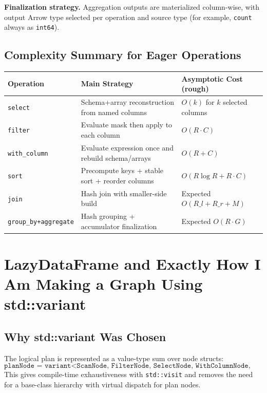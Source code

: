 \documentclass[11pt,a4paper]{article}
\begin{document}
\textbf{Finalization strategy.} Aggregation outputs are materialized column-wise, with output Arrow type selected per operation and source type (for example, \texttt{count} always as \texttt{int64}).

\subsection{Complexity Summary for Eager Operations}
\begin{longtable}{|p{3.1cm}|p{5.4cm}|p{5.0cm}|}
\hline
\textbf{Operation} & \textbf{Main Strategy} & \textbf{Asymptotic Cost (rough)} \\
\hline
\texttt{select} & Schema+array reconstruction from named columns & \(O(k)\) for \(k\) selected columns \\
\hline
\texttt{filter} & Evaluate mask then apply to each column & \(O(R \cdot C)\) \\
\hline
\texttt{with\_column} & Evaluate expression once and rebuild schema/arrays & \(O(R + C)\) \\
\hline
\texttt{sort} & Precompute keys + stable sort + reorder columns & \(O(R \log R + R\cdot C)\) \\
\hline
\texttt{join} & Hash join with smaller-side build & Expected \(O(R\_l + R\_r + M)\) \\
\hline
\texttt{group\_by+aggregate} & Hash grouping + accumulator finalization & Expected \(O(R\cdot G)\) \\
\hline
\end{longtable}

\section{LazyDataFrame and Exactly How I Am Making a Graph Using std::variant}

\subsection{Why std::variant Was Chosen}
The logical plan is represented as a value-type sum over node structs:
\[
\texttt{planNode = variant<ScanNode, FilterNode, SelectNode, WithColumnNode, GroupByNode, AggNode, JoinNode, SortNode, HeadNode>}
\]
This gives compile-time exhaustiveness with \texttt{std::visit} and removes the need for a base-class hierarchy with virtual dispatch for plan nodes.
\end{document}

